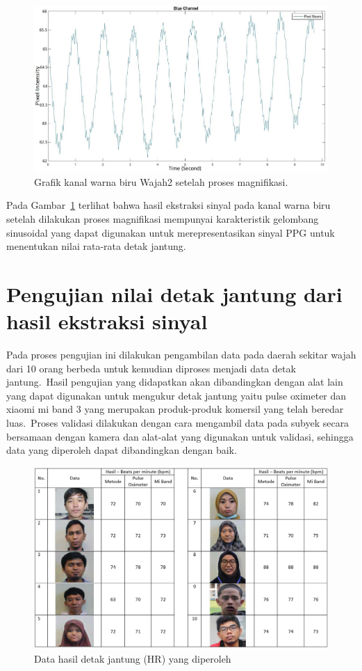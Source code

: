 \begin{figure}[ht]
	\vspace{0.5em}
	\centering
	\includegraphics[width=\textwidth,height=0.25\textheight]{Blue_channel_wajah2-result}
	\caption{Grafik kanal warna biru Wajah2 setelah proses magnifikasi.}
	\label{fig:grafik-blue-wajah2-result}   
\end{figure}
Pada Gambar~\ref{fig:grafik-blue-wajah2-result} terlihat bahwa hasil ekstraksi sinyal pada kanal warna biru setelah dilakukan proses magnifikasi mempunyai karakteristik gelombang sinusoidal yang dapat digunakan untuk merepresentasikan sinyal PPG untuk menentukan nilai rata-rata detak jantung.
\newpage
\section{Pengujian nilai detak jantung dari hasil ekstraksi sinyal}
Pada proses pengujian ini dilakukan pengambilan data pada daerah sekitar wajah dari 10 orang berbeda untuk kemudian diproses menjadi data detak jantung.~Hasil pengujian yang didapatkan akan dibandingkan dengan alat lain yang dapat digunakan untuk mengukur detak jantung yaitu pulse oximeter dan xiaomi mi band 3 yang merupakan produk-produk komersil yang telah beredar luas.~Proses validasi dilakukan dengan cara mengambil data pada subyek secara bersamaan dengan kamera dan alat-alat yang digunakan untuk validasi, sehingga data yang diperoleh dapat dibandingkan dengan baik.

\begin{figure}[ht]
	\vspace{0.5em}
	\centering
	\includegraphics[width=\textwidth]{data10}
	\caption{Data hasil detak jantung (HR) yang diperoleh}
	\label{fig:data1}   
\end{figure}

